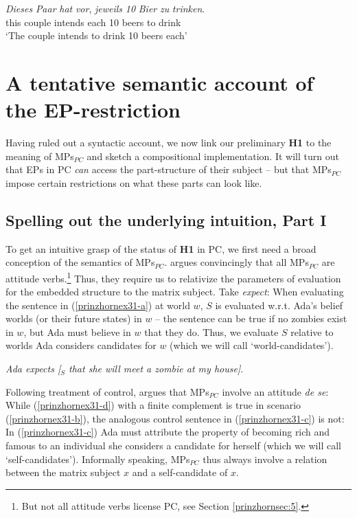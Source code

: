 \documentclass[output=paper,colorlinks,citecolor=brown,
]{langscibook}
\begin{document}
\ea \label{prinzhornex20}
\gll \textit{Dieses} \textit{Paar} \textit{hat} \textit{vor}, \textit{jeweils} \textit{10} \textit{Bier} \textit{zu} \textit{trinken}.\\
this couple intends {} each 10 beers to drink\\
\glt `The couple intends to drink 10 beers each' 
\z












\section{ A tentative semantic account of the EP-restriction}\label{prinzhornsec:4}

Having ruled out a syntactic account, we now link our preliminary \textbf{H1} to the meaning of MPs$_{PC}$ and sketch a compositional implementation. It will turn out that EPs in PC \textit{can} access the part-structure of their subject -- but that MPs$_{PC}$ impose certain restrictions on what these parts can look like.



\subsection{Spelling out the underlying intuition, Part I}\label{prinzhornsec:4.1}

To get an intuitive grasp of the status of {\bf H1} in PC, we first need a broad conception of the semantics of MPs$_{PC}$. \cite{Pearson:2016} argues convincingly that all MPs$_{PC}$ are attitude verbs.\footnote{But not all attitude verbs license PC, see Section \ref{prinzhornsec:5}. } Thus, they require us to relativize the parameters of evaluation for the embedded structure to the matrix subject. Take \textit{expect}: When evaluating the sentence in (\ref{prinzhornex31-a}) at world $w$, $S$ is evaluated w.r.t. Ada's belief worlds (or their future states) in $w$ -- the sentence can be true if no zombies exist in $w$, but Ada must believe in $w$ that they do. Thus, we evaluate $S$ relative to worlds  Ada considers candidates for $w$ (which we will call `world-candidates').

\ea  \label{prinzhornex31-a} \textit{Ada expects [$_{S}$ that she will meet a zombie at my house]}. \z

Following  \cite{Chierchia:1989} treatment of control, \cite{Pearson:2016} argues that MPs$_{PC}$ involve an attitude \textit{de se}: While (\ref{prinzhornex31-d}) with a finite complement is true in scenario (\ref{prinzhornex31-b}), the analogous control sentence  in (\ref{prinzhornex31-c}) is not: In (\ref{prinzhornex31-c}) Ada must attribute the property of becoming rich and famous to an individual she considers a candidate for herself (which we will call `self-candidates'). Informally speaking, MPs$_{PC}$ thus always involve a relation between the matrix subject $x$ and a self-candidate of $x$.
\end{document}
